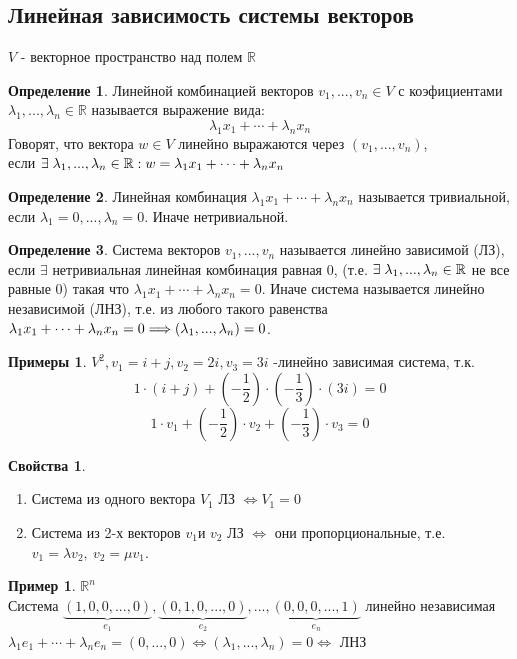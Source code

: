 \documentclass[a4paper, 12pt]{article}
\newcommand{\R}{\mathbb R}
\newcommand\tab[1][.5cm]{\hspace*{#1}}
\theoremstyle{definition}
\newtheorem*{definition}{Определение}
\newtheorem*{example}{Примеры}
\newtheorem*{example1}{Пример}
\newtheorem*{properties}{Свойства}
\begin{document}
  \subsection{Линейная зависимость системы векторов}
  $V$ - векторное пространство над полем $\R$
  \begin{definition}
    Линейной комбинацией векторов $v_1,...,v_n \in V$ с коэфициентами $\lambda_1,...,\lambda_n \in \R$ называется выражение вида: 
    $$\lambda_1 x_1 + \cdots + \lambda_n x_n$$ 
    Говорят, что вектора $w \in V$ линейно выражаются через $(v_1,...,v_n)$, \\ если $\exists\tab[0.1cm]\lambda_1,...,\lambda_n \in \R: w = \lambda_1 x_1 + \cdots + \lambda_n x_n$   
  \end{definition}   
  \begin{definition}
    Линейная комбинация $\lambda_1 x_1 + \cdots + \lambda_n x_n$ называется тривиальной, если $\lambda_1 = 0,...,\lambda_n = 0$. Иначе нетривиальной.
  \end{definition}
  \begin{definition}
    Система векторов $v_1,...,v_n$ называется линейно зависимой (ЛЗ), если $\exists$ нетривиальная линейная комбинация равная 0, (т.е. $\exists \tab[0.1cm]\lambda_1,...,\lambda_n \in \R$ не все равные 0) такая что $\lambda_1 x_1 + \cdots + \lambda_n x_n = 0$. Иначе система называется линейно независимой (ЛНЗ), т.е. из любого такого равенства $\lambda_1 x_1 + \cdots + \lambda_n x_n = 0 \\ \Longrightarrow (\lambda_1,...,\lambda_n) = 0$.
  \end{definition}
  \begin{example}
    $V^2, v_1 = i + j, v_2 = 2i, v_3 = 3i$ -линейно зависимая система, т.к. $$1 \cdot (i + j) + (- \frac{1}{2}) \cdot (-\frac{1}{3}) \cdot (3i) = 0$$ $$1 \cdot v_1 + (-\frac{1}{2}) \cdot v_2 + (-\frac{1}{3}) \cdot v_3 = 0$$  
  \end{example}  
  \begin{properties} \end{properties} 
    \begin{enumerate}
      \item Система из одного вектора $V_1$ ЛЗ $\Longleftrightarrow V_1 = 0$  
      \item Система из 2-х векторов $v_1 \text{и } v_2$ ЛЗ $\Longleftrightarrow$ они пропорциональные, т.е. \\$v_1 = \lambda v_2, \  v_2 = \mu v_1$. 
    \end{enumerate}
  \begin{example1}
    $\R^n$ \\
    Система $\underbrace{(1,0,0,...,0)}_{e_1} , \underbrace{(0,1,0,...,0)}_{e_2},...,\underbrace{(0,0,0,...,1)}_{e_n}$ линейно независимая \\
    $\lambda_1 e_1 + \cdots + \lambda_n e_n = (0,...,0) \Longleftrightarrow (\lambda_1,...,\lambda_n) = 0 \Longleftrightarrow $ ЛНЗ 
  \end{example1}
\end{document}
